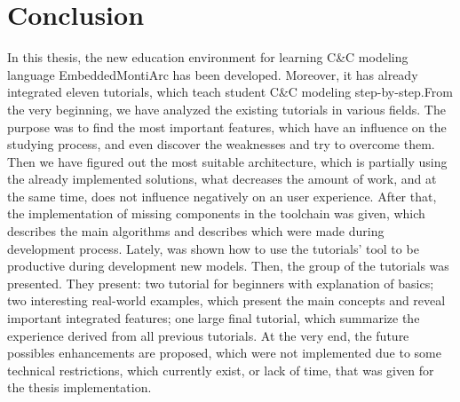 \chapter{Conclusion}

In this thesis, the new education environment for learning C\&C modeling language EmbeddedMontiArc has been developed. Moreover, it has already integrated eleven tutorials, which teach student C\&C modeling step-by-step.From the very beginning, we have analyzed the existing tutorials in various fields. The purpose was to find the most important features, which have an influence on the studying process, and even discover the weaknesses and try to overcome them. Then we have figured out the most suitable architecture, which is partially using the already implemented solutions, what decreases the amount of work, and at the same time, does not influence negatively on an user experience. After that, the implementation of missing components in the toolchain was given, which describes the main algorithms and describes which were made during development process. Lately, was shown how to use the tutorials' tool to be productive during development new models. Then, the group of the tutorials was presented. They present: two tutorial for beginners with explanation of basics; two interesting real-world examples, which present the main concepts and reveal important integrated features; one large final tutorial, which summarize the experience derived from all previous tutorials. At the very end, the future possibles enhancements are proposed, which were not implemented due to some technical restrictions, which currently exist, or lack of time, that was given for the thesis implementation.

\cleardoublepage
